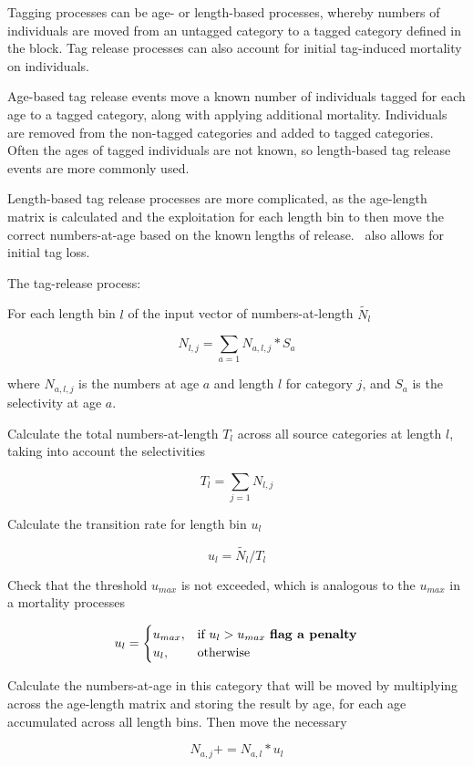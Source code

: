 Tagging processes can be age- or length-based processes, whereby numbers of individuals are moved from an untagged category to a tagged category defined in the  block. Tag release processes can also account for initial tag-induced mortality on individuals.

Age-based tag release events move a known number of individuals tagged for each age to a tagged category, along with applying additional mortality. Individuals are removed from the non-tagged categories and added to tagged categories. Often the ages of tagged individuals are not known, so length-based tag release events are more commonly used.

Length-based tag release processes are more complicated, as the age-length matrix is calculated and the exploitation for each length bin to then move the correct numbers-at-age based on the known lengths of release. \CNAME\ also allows for initial tag loss.

The tag-release process:

For each length bin $l$ of the input vector of numbers-at-length $\tilde{N_l}$

$$N_{l,j} = \sum_{a = 1}N_{a,l,j} * S_a$$

where $N_{a,l,j}$ is the numbers at age $a$ and length $l$ for category $j$, and $S_a$ is the selectivity at age $a$.

Calculate the total numbers-at-length $T_l$ across all source categories at length $l$, taking into account the selectivities

$$T_l = \sum_{j = 1}N_{l,j}$$

Calculate the transition rate for length bin $u_l$

$$u_{l} = \tilde{N_l} / T_l$$

Check that the threshold $u_{max}$ is not exceeded, which is analogous to the $u_{max}$ in a mortality processes

\[
u_{l} =
\begin{cases}
u_{max},& \text{if } u_{l} > u_{max} \text{ \textbf{flag a penalty}}\\
u_{l},  & \text{otherwise}
\end{cases}
\]

Calculate the numbers-at-age in this category that will be moved by multiplying across the age-length matrix and storing the result by age, for each age accumulated across all length bins. Then move the necessary

$$N_{a,j} += N_{a,l} * u_l$$

